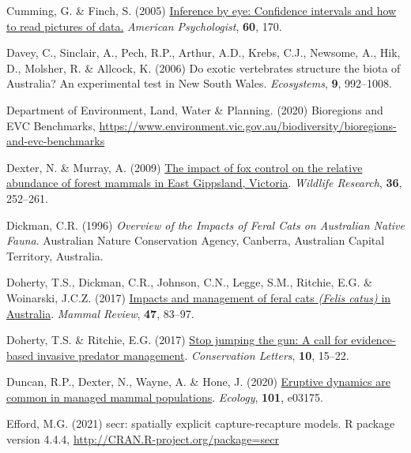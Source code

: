 \documentclass[preprint, 3p, authoryear]{elsarticle} %
\newlength{\cslhangindent}
\newlength{\cslentryspacingunit} %
\newenvironment{CSLReferences}[2] %
 {%
  \setlength{\parindent}{0pt}
  \ifodd #1
  \let\oldpar\par
  \def\par{\hangindent=\cslhangindent\oldpar}
  \fi
  \setlength{\parskip}{#2\cslentryspacingunit}
 }%
 {}
\begin{document}
\begin{CSLReferences}{1}{0}
\leavevmode{}%
Cumming, G. \& Finch, S. (2005) \href{https://doi.org/10.1037/0003-066X.60.2.170}{Inference by eye: Confidence intervals and how to read pictures of data.} \emph{American Psychologist}, \textbf{60}, 170.

\leavevmode{}%
Davey, C., Sinclair, A., Pech, R.P., Arthur, A.D., Krebs, C.J., Newsome, A., Hik, D., Molsher, R. \& Allcock, K. (2006) Do exotic vertebrates structure the biota of {{A}ustralia}? An experimental test in {New South Wales}. \emph{Ecosystems}, \textbf{9}, 992--1008.

\leavevmode{}%
Department of Environment, Land, Water \& Planning. (2020) {Bioregions and EVC Benchmarks}, \url{https://www.environment.vic.gov.au/biodiversity/bioregions-and-evc-benchmarks}

\leavevmode{}%
Dexter, N. \& Murray, A. (2009) \href{https://doi.org/10.1071/WR08135}{The impact of fox control on the relative abundance of forest mammals in {East Gippsland, Victoria}}. \emph{Wildlife Research}, \textbf{36}, 252--261.

\leavevmode{}%
Dickman, C.R. (1996) \emph{Overview of the Impacts of Feral Cats on {{A}ustralian} Native Fauna}. {A}ustralian Nature Conservation Agency, Canberra, Australian Capital Territory, Australia.

\leavevmode{}%
Doherty, T.S., Dickman, C.R., Johnson, C.N., Legge, S.M., Ritchie, E.G. \& Woinarski, J.C.Z. (2017) \href{https://doi.org/10.1111/mam.12080}{Impacts and management of feral cats \emph{({Felis catus})} in {{A}ustralia}}. \emph{Mammal Review}, \textbf{47}, 83--97.

\leavevmode{}%
Doherty, T.S. \& Ritchie, E.G. (2017) \href{https://doi.org/10.1111/conl.12251}{Stop jumping the gun: A call for evidence-based invasive predator management}. \emph{Conservation Letters}, \textbf{10}, 15--22.

\leavevmode{}%
Duncan, R.P., Dexter, N., Wayne, A. \& Hone, J. (2020) \href{https://doi.org/10.1002/ecy.3175}{Eruptive dynamics are common in managed mammal populations}. \emph{Ecology}, \textbf{101}, e03175.

\leavevmode{}%
Efford, M.G. (2021) {secr: spatially explicit capture-recapture models. R package version 4.4.4}, \url{http://CRAN.R-project.org/package=secr}


\end{CSLReferences}
\end{document}
